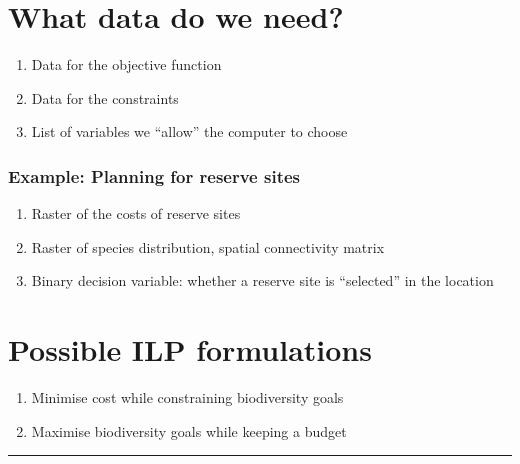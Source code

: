\documentclass[
]{article}
\providecommand{\tightlist}{%
  \setlength{\itemsep}{0pt}\setlength{\parskip}{0pt}}
\begin{document}
\hypertarget{what-data-do-we-need}{%
\section{What data do we need?}\label{what-data-do-we-need}}

\begin{enumerate}
\def\labelenumi{\alph{enumi})}
\item
  Data for the objective function
\item
  Data for the constraints
\item
  List of variables we ``allow'' the computer to choose
\end{enumerate}

\hypertarget{example-planning-for-reserve-sites}{%
\subsubsection{Example: Planning for reserve
sites}\label{example-planning-for-reserve-sites}}

\begin{enumerate}
\def\labelenumi{\alph{enumi})}
\item
  Raster of the costs of reserve sites
\item
  Raster of species distribution, spatial connectivity matrix
\item
  Binary decision variable: whether a reserve site is ``selected'' in
  the location
\end{enumerate}

\hypertarget{possible-ilp-formulations}{%
\section{Possible ILP formulations}\label{possible-ilp-formulations}}

\begin{enumerate}
\def\labelenumi{\arabic{enumi}.}
\tightlist
\item
  Minimise cost while constraining biodiversity goals
\item
  Maximise biodiversity goals while keeping a budget
\end{enumerate}

\begin{center}\rule{0.5\linewidth}{0.5pt}\end{center}
\end{document}
